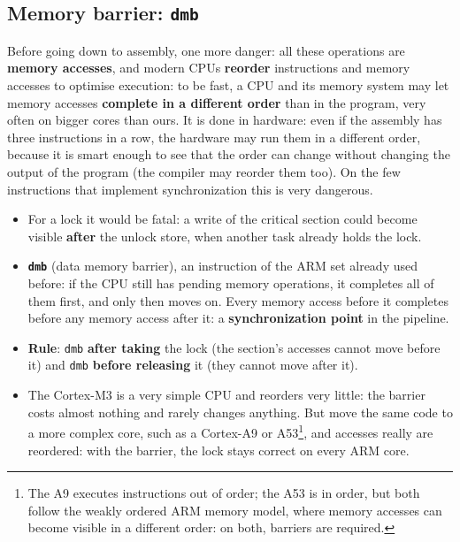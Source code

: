\subsection{Memory barrier: \texttt{dmb}}
Before going down to assembly, one more danger: all these operations are \textbf{memory accesses}, and modern CPUs \textbf{reorder} instructions and memory accesses to optimise execution: to be fast, a CPU and its memory system may let memory accesses \textbf{complete in a different order} than in the program, very often on bigger cores than ours. It is done in hardware: even if the assembly has three instructions in a row, the hardware may run them in a different order, because it is smart enough to see that the order can change without changing the output of the program (the compiler may reorder them too). On the few instructions that implement synchronization this is very dangerous.
\begin{itemize}
    \item For a lock it would be fatal: a write of the critical section could become visible \textbf{after} the unlock store, when another task already holds the lock.
    \item \textbf{\texttt{dmb}} (data memory barrier), an instruction of the ARM set already used before: if the CPU still has pending memory operations, it completes all of them first, and only then moves on. Every memory access before it completes before any memory access after it: a \textbf{synchronization point} in the pipeline.
    \item \textbf{Rule}: \texttt{dmb} \textbf{after taking} the lock (the section's accesses cannot move before it) and \texttt{dmb} \textbf{before releasing} it (they cannot move after it).
    \item The Cortex-M3 is a very simple CPU and reorders very little: the barrier costs almost nothing and rarely changes anything. But move the same code to a more complex core, such as a Cortex-A9 or A53\footnote{The A9 executes instructions out of order; the A53 is in order, but both follow the weakly ordered ARM memory model, where memory accesses can become visible in a different order: on both, barriers are required.}, and accesses really are reordered: with the barrier, the lock stays correct on every ARM core.
\end{itemize}

